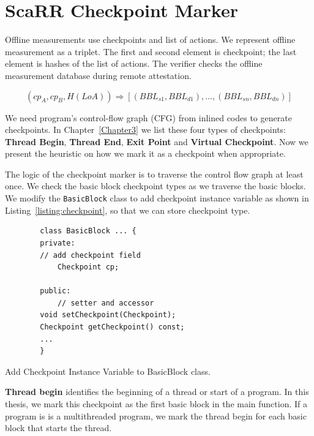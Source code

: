 \section{ScaRR Checkpoint Marker} 
\label{sec:scarr-checkpoint-marker}


Offline measurements use checkpoints and list of actions. We represent offline
measurement as a triplet. The first and second element is checkpoint; the last
element is hashes of the list of actions. The verifier checks the offline
measurement database during remote attestation.

$$(cp_A, cp_B, H(LoA)) \Rightarrow [(BBL_{s1}, BBL_{d1}), ..., (BBL_{sn},
BBL_{dn})]$$

We need program's control-flow graph (CFG) from inlined codes to generate
checkpoints. In Chapter~\ref{Chapter3} we list these four types of checkpoints:
\textbf{Thread Begin}, \textbf{Thread End}, \textbf{Exit Point} and
\textbf{Virtual Checkpoint}. Now we present the heuristic on how we mark it as a
checkpoint when appropriate.  

The logic of the checkpoint marker is to traverse the control flow graph at
least once. We check the basic block checkpoint types as we traverse the basic
blocks. We modify the \texttt{BasicBlock} class to add checkpoint instance variable as
shown in Listing~\ref{listing:checkpoint}, so that we can store checkpoint type.

\begin{listing}[ht!]
    \begin{verbatim}
        class BasicBlock ... {
        private:
        // add checkpoint field
            Checkpoint cp;

        public:
            // setter and accessor
        void setCheckpoint(Checkpoint);
        Checkpoint getCheckpoint() const;
        ...
        }
    \end{verbatim}
    \caption{Add Checkpoint Instance Variable to BasicBlock class.}    
    \label{listing:checkpoint}
\end{listing}

\vspace{0.5cm}
\noindent \textbf{Thread begin} identifies the beginning of a thread or start of
a program. In this thesis, we mark this checkpoint as the first basic block in
the main function. If a program is is a multithreaded program, we mark the
thread begin for each basic block that starts the thread.

